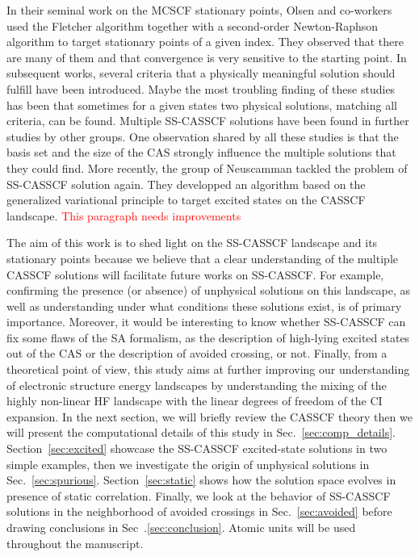 \documentclass[aps,prb,reprint,showkeys,superscriptaddress]{revtex4-1}
\newcommand{\todo}[1]{\textcolor{red}{#1}}
\begin{document}
In their seminal work on the MCSCF stationary points, Olsen and co-workers used the Fletcher algorithm together with a second-order Newton-Raphson algorithm to target stationary points of a given index. \cite{Olsen_1982,Olsen_1983}
They observed that there are many of them and that convergence is very sensitive to the starting point.
In subsequent works, several criteria that a physically meaningful solution should fulfill have been introduced. \cite{Olsen_1983,Golab_1983,Golab_1985,Rizzo_1990}
Maybe the most troubling finding of these studies has been that sometimes for a given states two physical solutions, \ie matching all criteria, can be found. \cite{Rizzo_1990}
Multiple SS-CASSCF solutions have been found in further studies by other groups. \cite{Guihery_1997,Angeli_2003}
One observation shared by all these studies is that the basis set and the size of the CAS strongly influence the multiple solutions that they could find.
More recently, the group of Neuscamman tackled the problem of SS-CASSCF solution again. They developped an algorithm based on the generalized variational principle to target excited states on the CASSCF landscape. \cite{Tran_2019,Tran_2020,Hanscam_2021}
\todo{This paragraph needs improvements}

The aim of this work is to shed light on the SS-CASSCF landscape and its stationary points because we believe that a clear understanding of the multiple CASSCF solutions will facilitate future works on SS-CASSCF.
For example, confirming the presence (or absence) of unphysical solutions on this landscape, as well as understanding under what conditions these solutions exist, is of primary importance.
Moreover, it would be interesting to know whether SS-CASSCF can fix some flaws of the SA formalism, as the description of high-lying excited states out of the CAS or the description of avoided crossing, or not.
Finally, from a theoretical point of view, this study aims at further improving our understanding of electronic structure energy landscapes by understanding the mixing of the highly non-linear HF landscape with the linear degrees of freedom of the CI expansion.
In the next section, we will briefly review the CASSCF theory then we will present the computational details of this study in Sec.~\ref{sec:comp_details}.
Section~\ref{sec:excited} showcase the SS-CASSCF excited-state solutions in two simple examples, then we investigate the origin of unphysical solutions in Sec.~\ref{sec:spurious}.
Section~\ref{sec:static} shows how the solution space evolves in presence of static correlation.
Finally, we look at the behavior of SS-CASSCF solutions in the neighborhood of avoided crossings in Sec.~\ref{sec:avoided} before drawing conclusions in Sec~.\ref{sec:conclusion}.
Atomic units will be used throughout the manuscript.
\end{document}
